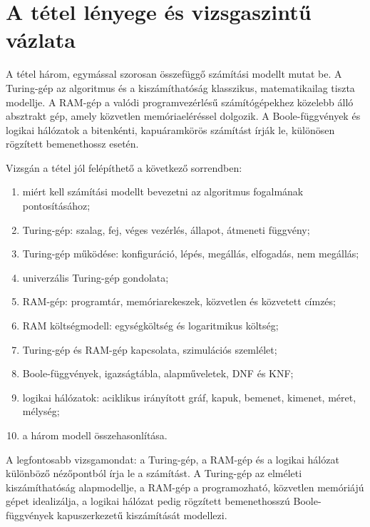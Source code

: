 \section{A tétel lényege és vizsgaszintű vázlata}

\begin{summarybox}
A tétel három, egymással szorosan összefüggő számítási modellt mutat be. A Turing-gép az algoritmus és a kiszámíthatóság klasszikus, matematikailag tiszta modellje. A RAM-gép a valódi programvezérlésű számítógépekhez közelebb álló absztrakt gép, amely közvetlen memóriaeléréssel dolgozik. A Boole-függvények és logikai hálózatok a bitenkénti, kapuáramkörös számítást írják le, különösen rögzített bemenethossz esetén.
\end{summarybox}

Vizsgán a tétel jól felépíthető a következő sorrendben:

\begin{enumerate}
  \item miért kell számítási modellt bevezetni az algoritmus fogalmának pontosításához;
  \item Turing-gép: szalag, fej, véges vezérlés, állapot, átmeneti függvény;
  \item Turing-gép működése: konfiguráció, lépés, megállás, elfogadás, nem megállás;
  \item univerzális Turing-gép gondolata;
  \item RAM-gép: programtár, memóriarekeszek, közvetlen és közvetett címzés;
  \item RAM költségmodell: egységköltség és logaritmikus költség;
  \item Turing-gép és RAM-gép kapcsolata, szimulációs szemlélet;
  \item Boole-függvények, igazságtábla, alapműveletek, DNF és KNF;
  \item logikai hálózatok: aciklikus irányított gráf, kapuk, bemenet, kimenet, méret, mélység;
  \item a három modell összehasonlítása.
\end{enumerate}

A legfontosabb vizsgamondat: a Turing-gép, a RAM-gép és a logikai hálózat különböző nézőpontból írja le a számítást. A Turing-gép az elméleti kiszámíthatóság alapmodellje, a RAM-gép a programozható, közvetlen memóriájú gépet idealizálja, a logikai hálózat pedig rögzített bemenethosszú Boole-függvények kapuszerkezetű kiszámítását modellezi.

\begin{center}

\end{center}

